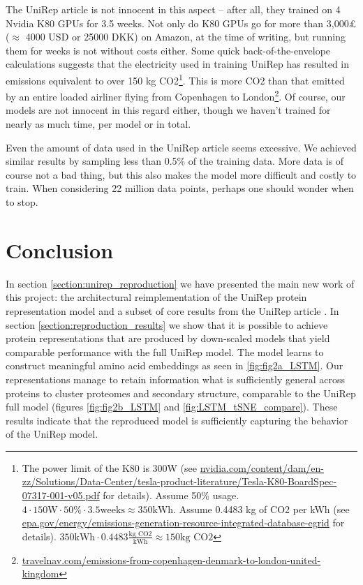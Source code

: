 \documentclass[a4paper,12pt]{article}
\begin{document}
The UniRep article is not innocent in this aspect -- after all, they trained on 4 Nvidia K80 GPUs for 3.5 weeks. Not only do K80 GPUs go for more than 3,000£ ($\approx$ 4000 USD or 25000 DKK) on Amazon, at the time of writing, but running them for weeks is not without costs either. Some quick back-of-the-envelope calculations suggests that the electricity used in training UniRep has resulted in emissions equivalent to over 150 kg CO2\footnote{The power limit of the K80 is 300W (see \url{nvidia.com/content/dam/en-zz/Solutions/Data-Center/tesla-product-literature/Tesla-K80-BoardSpec-07317-001-v05.pdf} for details). Assume 50\% usage. $4 \cdot 150\text{W} \cdot 50\% \cdot 3.5\text{weeks} \approx 350\text{kWh}$. Assume 0.4483 kg of CO2 per kWh (see \url{epa.gov/energy/emissions-generation-resource-integrated-database-egrid} for details). $350\text{kWh} \cdot 0.4483 \frac{\text{kg CO2}}{\text{kWh}} \approx 150 \text{kg CO2}$}. This is more CO2 than that emitted by an entire loaded airliner flying from Copenhagen to London\footnote{\url{travelnav.com/emissions-from-copenhagen-denmark-to-london-united-kingdom}}. Of course, our models are not innocent in this regard either, though we haven't trained for nearly as much time, per model or in total.

Even the amount of data used in the UniRep article seems excessive. We achieved similar results by sampling less than 0.5\% of the training data. More data is of course not a bad thing, but this also makes the model more difficult and costly to train. When considering 22 million data points, perhaps one should wonder when to stop.

\clearpage
\section{Conclusion}
In section \ref{section:unirep_reproduction} we have presented the main new work of this project: the architectural reimplementation of the UniRep protein representation model and a subset of core results from the UniRep article \cite{alley2019unified}. In section \ref{section:reproduction_results} we show that it is possible to achieve protein representations that are produced by down-scaled models that yield comparable performance with the full UniRep model. The model learns to construct meaningful amino acid embeddings as seen in \ref{fig:fig2a_LSTM}. Our representations manage to retain information what is sufficiently general across proteins to cluster proteomes and secondary structure, comparable to the UniRep full model (figures \ref{fig:fig2b_LSTM} and \ref{fig:LSTM_tSNE_compare}). These results indicate that the reproduced model is sufficiently capturing the behavior of the UniRep model. 
\end{document}

